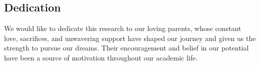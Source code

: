 \begin{center}
    \section*{Dedication}
\end{center}
\large We would like to dedicate this research to our loving parents, whose constant love, sacrifices, and unwavering support have shaped our journey and given us the strength to pursue our dreams. Their encouragement and belief in our potential have been a source of motivation throughout our academic life.
